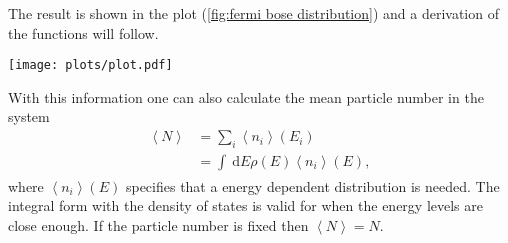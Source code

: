 \documentclass[a4paper,10pt]{article}
\newcommand{\td}{\,\text{d}}
\newenvironment{Figure}
  {\par\medskip\noindent\minipage{\linewidth}}
  {\endminipage\par\medskip}%
\numberwithin{equation}{section}
\begin{document}
\begin{multicols}{2}
The result is shown in the plot (\ref{fig:fermi bose distribution}) and a derivation of the functions will follow.
\begin{Figure}
    \centering
    \texttt{[image: plots/plot.pdf]}
     \label{fig:fermi bose distribution}
\end{Figure}

With this information one can also calculate the mean particle number in the system
\begin{align} 
  \left\langle N\right\rangle  &= \sum_{i}^{}\left\langle n_i\right\rangle \!(E_i)\\
                               &= \int_{}^{}\td E\rho (E)\left\langle n_i\right\rangle \!(E)
,\end{align} 
where $\left\langle n_i\right\rangle \!(E)$ specifies that a energy dependent distribution is needed.
The integral form with the density of states is valid for when the energy levels are close enough.
If the particle number is fixed then $\left\langle N\right\rangle =N$.


\end{multicols}
\end{document}
